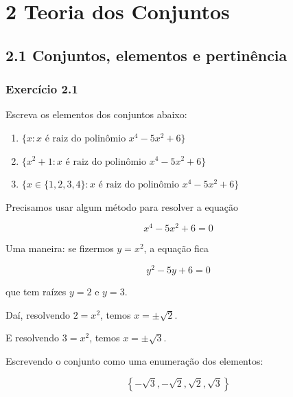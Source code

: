 \documentclass[
  letterpaper,
  DIV=11,
  numbers=noendperiod]{scrreprt}
\begin{document}

\chapter*{2 Teoria dos Conjuntos}\label{teoria-dos-conjuntos}


\section*{2.1 Conjuntos, elementos e
pertinência}\label{conjuntos-elementos-e-pertinuxeancia}


\subsection*{Exercício 2.1}\label{exr-2-1}

Escreva os elementos dos conjuntos abaixo:

\begin{enumerate}
\def\labelenumi{\alph{enumi})}
\item
  $\{ x : x \text{ é raiz do polinômio } x^4 - 5x^2 + 6 \}$
\item
  $\{ x^2 + 1 : x \text{ é raiz do polinômio } x^4 - 5x^2 + 6 \}$
\item
  $\{ x \in \{1, 2, 3, 4\} : x \text{ é raiz do polinômio } x^4 - 5x^2 + 6 \}$
\end{enumerate}

\begin{tcolorbox}[enhanced jigsaw, left=2mm, titlerule=0mm, colbacktitle=quarto-callout-important-color!10!white, title={Resposta (a)}, arc=.35mm, opacityback=0, bottomrule=.15mm, breakable, toprule=.15mm, colback=white, coltitle=black, bottomtitle=1mm, rightrule=.15mm, toptitle=1mm, leftrule=.75mm, colframe=quarto-callout-important-color-frame, opacitybacktitle=0.6]

Precisamos usar algum método para resolver a equação

\[
x^4 - 5x^2 + 6 = 0
\]

Uma maneira: se fizermos $y = x^2$, a equação fica

\[
y^2 - 5y + 6 = 0
\]

que tem raízes $y = 2$ e $y = 3$.

Daí, resolvendo $2 = x^2$, temos $x = \pm\sqrt2$.

E resolvendo $3 = x^2$, temos $x = \pm\sqrt3$.

Escrevendo o conjunto como uma enumeração dos elementos:

\[
\left\{ -\sqrt3, -\sqrt2, \sqrt2, \sqrt3 \right\}
\]

\end{tcolorbox}
\end{document}
